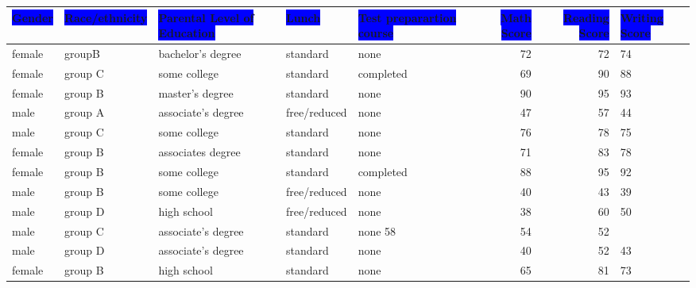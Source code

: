 \documentclass{article}
\begin{document}
	\begin{table}
		\begin{center}
			\begin{tabular}{l|l|l|l|l|r|r|l}
					\colorbox{blue}{Gender} &\colorbox{blue}{Race/ethnicity} & \colorbox{blue}{Parental Level of Education} & \colorbox{blue}{Lunch} & \colorbox{blue}{Test preparartion course} & \colorbox{blue}{Math Score} & \colorbox{blue}{Reading Score} & \colorbox{blue}{Writing Score}\\	
				\hline
				female & groupB & bachelor's degree & standard & none & 72 & 72 & 74\\
				\hline
				female & group C & some college & standard & completed & 69 & 90 & 88\\
				\hline
				female & group B & master's degree & standard & none & 90 & 95 & 93\\
				\hline
				male & group A & associate's degree & free/reduced & none & 47 & 57 & 44\\
				\hline
				male & group  C & some college & standard & none & 76 & 78 & 75\\
				\hline
				female & group B & associates degree & standard & none & 71 & 83 & 78\\
				\hline
				female & group B & some college & standard & completed & 88 & 95 & 92\\
				\hline
				male & group B & some college & free/reduced & none & 40 & 43 & 39\\
				\hline
				male & group D & high school & free/reduced & none & 38 & 60 & 50\\
				male & group C & associate's degree & standard & none 58 & 54 & 52\\
				male & group D & associate's degree & standard & none & 40 & 52 & 43\\
				female & group B & high school & standard & none & 65 & 81 & 73\\
				
				\end{tabular}
		\end{center}
	\end{table}
\end{document}
